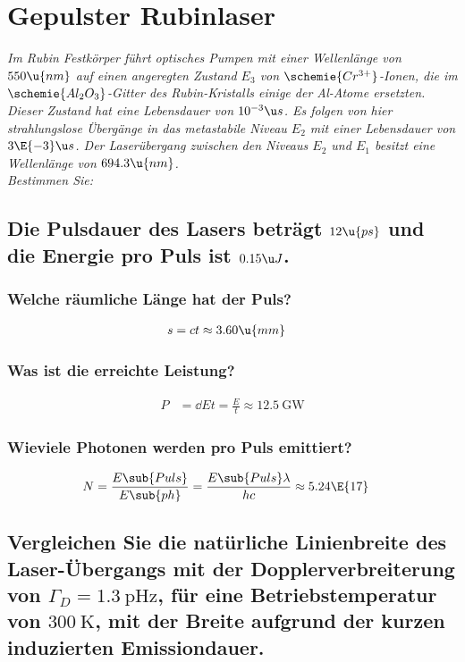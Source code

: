 \documentclass[ex]{exercise_4.1}
\begin{document}
\section{Gepulster Rubinlaser}
{\it Im Rubin Festkörper führt optisches Pumpen mit einer Wellenlänge von \(550\u{nm}\) auf einen angeregten Zustand \(E_3\) von \(\schemie{Cr^{3+}}\)-Ionen, die im \(\schemie{Al_2O_3}\)-Gitter des Rubin-Kristalls einige der Al-Atome ersetzten. Dieser Zustand hat eine Lebensdauer von \(10^{-3}\u s \). Es folgen von hier strahlungslose Übergänge in das metastabile Niveau \(E_2\) mit einer Lebensdauer von \(3\E{-3}\u s\). Der Laserübergang zwischen den Niveaus \(E_2\) und \(E_1\) besitzt eine Wellenlänge von \(694.3\u{nm}\).\\
Bestimmen Sie:
}

\subsection{Die Pulsdauer des Lasers beträgt \(12\u{ps}\) und die Energie pro Puls ist \(0.15\u J\).}

\subsubsection{Welche räumliche Länge hat der Puls?}
\begin{align*}
    s &=  c t \approx 3.60\u{mm}
\end{align*}

\subsubsection{Was ist die erreichte Leistung?}
\begin{align*}
    P &= \dd Et = \frac{E}{t} \approx \SI{12.5}{\GW}
\end{align*}

\subsubsection{Wieviele Photonen werden pro Puls emittiert?}
\begin{align*}
    N &= \frac{E\sub{Puls}}{E\sub{ph}} 
    = \frac{E\sub{Puls}\lambda}{h c}
    \approx 5.24\E{17}
\end{align*}


\subsection{Vergleichen Sie die natürliche Linienbreite des Laser-Übergangs mit der Dopplerverbreiterung von \(\Gamma_D=\SI{1.3}{\pico\Hz}\), für eine Betriebstemperatur von \(\SI{300}\K\), mit der Breite aufgrund der kurzen induzierten Emissiondauer.}
\end{document}
